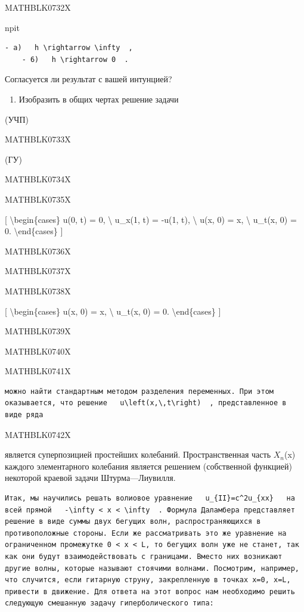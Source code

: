 \documentclass[
]{article}
\providecommand{\tightlist}{%
  \setlength{\itemsep}{0pt}\setlength{\parskip}{0pt}}
\begin{document}
MATHBLK0732X

npit

\begin{verbatim}
- a)   h \rightarrow \infty  ,
    - 6)   h \rightarrow 0  .
\end{verbatim}

Согласуется ли результат с вашей интунцией?

\begin{enumerate}
\def\labelenumi{\arabic{enumi}.}
\setcounter{enumi}{3}
\tightlist
\item
  Изобразить в общих чертах решение задачи
\end{enumerate}

(УЧП)

MATHBLK0733X

(ГУ)

MATHBLK0734X

MATHBLK0735X

{[} \textbackslash begin\{cases\} u(0, t) = 0, \textbackslash{} u\_x(1,
t) = -u(1, t), \textbackslash{} u(x, 0) = x, \textbackslash{} u\_t(x, 0)
= 0. \textbackslash end\{cases\} {]}

MATHBLK0736X

MATHBLK0737X

MATHBLK0738X

{[} \textbackslash begin\{cases\} u(x, 0) = x, \textbackslash{} u\_t(x,
0) = 0. \textbackslash end\{cases\} {]}

MATHBLK0739X

MATHBLK0740X

MATHBLK0741X

\begin{verbatim}
можно найти стандартным методом разделения переменных. При этом оказывается, что решение   u\left(x,\,t\right)  , представленное в виде ряда
\end{verbatim}

MATHBLK0742X

является суперпозицией простейших колебаний. Пространственная часть
\(X_n\)(x) каждого элементарного колебания является решением
(собственной функцией) некоторой краевой задачи Штурма---Лиувилля.

\begin{verbatim}
Итак, мы научились решать волиовое уравнение   u_{II}=c^2u_{xx}   на всей прямой   -\infty < x < \infty  . Формула Даламбера представляет решение в виде суммы двух бегущих волн, распространяющихся в противоположные стороны. Если же рассматривать это же уравнение на ограниченном промежутке 0 < x < L, то бегущих волн уже не станет, так как они будут взаимодействовать с границами. Вместо них возникают другие волны, которые называют стоячими волнами. Посмотрим, например, что случится, если гитарную струну, закрепленную в точках x=0, x=L, привести в движение. Для ответа на этот вопрос нам необходимо решить следующую смешанную задачу гиперболического типа:
\end{verbatim}
\end{document}
